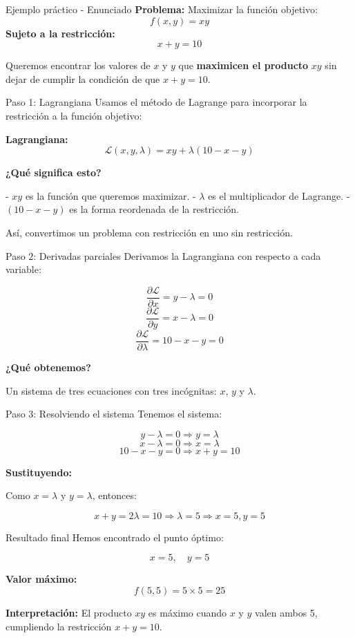 \documentclass{beamer}
\begin{document}
\begin{frame}{Ejemplo práctico - Enunciado}
\textbf{Problema:} Maximizar la función objetivo:
\[
f(x, y) = xy
\]
\textbf{Sujeto a la restricción:}
\[
x + y = 10
\]

Queremos encontrar los valores de $x$ y $y$ que \textbf{maximicen el producto} $xy$ sin dejar de cumplir la condición de que $x + y = 10$.
\end{frame}
\begin{frame}{Paso 1: Lagrangiana}
Usamos el método de Lagrange para incorporar la restricción a la función objetivo:

\textbf{Lagrangiana:}
\[
\mathcal{L}(x, y, \lambda) = xy + \lambda (10 - x - y)
\]

\textbf{¿Qué significa esto?}

- $xy$ es la función que queremos maximizar.
- $\lambda$ es el multiplicador de Lagrange.
- $(10 - x - y)$ es la forma reordenada de la restricción.

Así, convertimos un problema con restricción en uno sin restricción.
\end{frame}
\begin{frame}{Paso 2: Derivadas parciales}
Derivamos la Lagrangiana con respecto a cada variable:

\[
\frac{\partial \mathcal{L}}{\partial x} = y - \lambda = 0
\]
\[
\frac{\partial \mathcal{L}}{\partial y} = x - \lambda = 0
\]
\[
\frac{\partial \mathcal{L}}{\partial \lambda} = 10 - x - y = 0
\]

\textbf{¿Qué obtenemos?}

Un sistema de tres ecuaciones con tres incógnitas: $x$, $y$ y $\lambda$.
\end{frame}
\begin{frame}{Paso 3: Resolviendo el sistema}
Tenemos el sistema:

\[
y - \lambda = 0 \Rightarrow y = \lambda
\]
\[
x - \lambda = 0 \Rightarrow x = \lambda
\]
\[
10 - x - y = 0 \Rightarrow x + y = 10
\]

\textbf{Sustituyendo:}

Como $x = \lambda$ y $y = \lambda$, entonces:

\[
x + y = 2\lambda = 10 \Rightarrow \lambda = 5
\Rightarrow x = 5, y = 5
\]
\end{frame}
\begin{frame}{Resultado final}
Hemos encontrado el punto óptimo:

\[
x = 5, \quad y = 5
\]

\textbf{Valor máximo:}
\[
f(5, 5) = 5 \times 5 = 25
\]

\textbf{Interpretación:}  
El producto $xy$ es máximo cuando $x$ y $y$ valen ambos 5, cumpliendo la restricción $x + y = 10$.
\end{frame}
\end{document}

